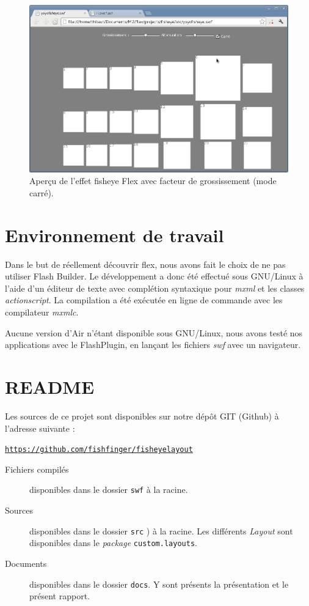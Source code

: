 \begin{minipage}[H]{.5\textwidth}
\begin{figure}[H]
  \centering
  \includegraphics[width=\textwidth]{../resources/illustrations/flex_screen_3}
  \caption{Aperçu de l'effet fisheye Flex avec facteur de grossissement (mode carré).}
  \label{fig:js_6}
\end{figure}
\end{minipage}

\section{Environnement de travail}

Dans le but de réellement découvrir flex, nous avons fait le choix de ne pas utiliser Flash Builder. Le développement a donc été effectué sous GNU/Linux à l'aide d'un éditeur de texte avec complétion syntaxique pour \emph{mxml} et les classes \emph{actionscript}. La compilation a été exécutée en ligne de commande avec les compilateur \emph{mxmlc}.

Aucune version d'Air n'étant disponible sous GNU/Linux, nous avons testé nos applications avec le FlashPlugin, en lançant les fichiers \emph{swf} avec un navigateur.

\section{README}
\label{sec:readme}
Les sources de ce projet sont disponibles sur notre dépôt GIT (Github) à l'adresse suivante :
\begin{center}
  \href{https://github.com/fishfinger/fisheyelayout}{\texttt{https://github.com/fishfinger/fisheyelayout}}
\end{center}

\begin{description}
  \item[Fichiers compilés] disponibles dans le dossier \texttt{swf} à la racine.
  \item[Sources] disponibles dans le dossier \texttt{src} ) à la racine. Les différents \emph{Layout} sont disponibles dans le \emph{package} \texttt{custom.layouts}.
  \item[Documents] disponibles dans le dossier \texttt{docs}. Y sont présents la présentation et le présent rapport.
\end{description}